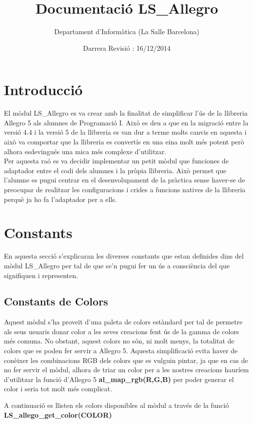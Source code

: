 \documentclass[11pt]{article}
\title{Documentació LS\_Allegro}
\author{Departament d'Informàtica (La Salle Barcelona)}
\date{Darrera Revisió : 16/12/2014}
\begin{document}
\maketitle

\tableofcontents

\pagebreak


\section{Introducció}
El mòdul LS\_Allegro es va crear amb la finalitat de simplificar l'ús de la llibreria Allegro 5 als alumnes de Programació I. Això es deu a que en la migració entre la versió 4.4 i la versió 5 de la llibreria es van dur a terme molts canvis en aquesta i això va comportar que la llibreria es convertís en una eina molt més potent però alhora esdevingués una mica més complexe d'utilitzar.\\
Per aquesta raó es va decidir implementar un petit mòdul que funciones de adaptador entre el codi dels alumnes i la pròpia llibreria. Això permet que l'alumne es pugui centrar en el desenvolupament de la pràctica sense haver-se de preocupar de realitzar les configuracions i crides a funcions natives de la llibreria perquè ja ho fa l'adaptador per a ells.


\section{Constants}
En aquesta secció s'explicaran les diverses constants que estan definides dins del mòdul LS\_Allegro per tal de que se'n pugui fer un ús a consciència del que signifiquen i representen.

\subsection{Constants de Colors}
Aquest mòdul s'ha proveït d'una paleta de colors estàndard per tal de permetre als seus usuaris donar color a les seves creacions fent ús de la gamma de colors més comuna. No obstant, aquest colors no són, ni molt menys, la totalitat de colors que es poden fer servir a Allegro 5. Aquesta simplificació evita haver de conèixer les combinacions RGB dels colors que es vulguin pintar, ja que en cas de no fer servir el mòdul, alhora de triar un color per a les nostres creacions hauríem d'utilitzar la funció d'Allegro 5 \textbf{al\_map\_rgb(R,G,B)} per poder generar el color i seria tot molt més complicat.

\pagebreak
\noindent A continuació es llisten els colors disponibles al mòdul a través de la funció \textbf{LS\_allego\_get\_color(COLOR)}
\end{document}
